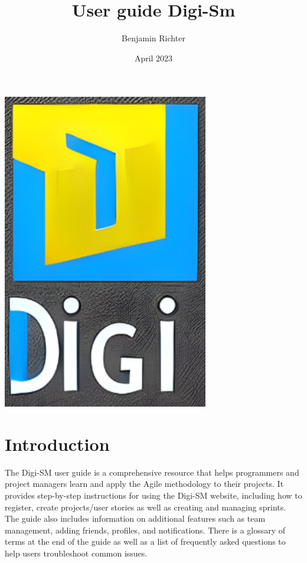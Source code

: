 \documentclass{article}
\title{User guide Digi-Sm}
\author{Benjamin Richter}
\date{April 2023}
\begin{document}
\maketitle


\vfill

\begin{center}
    \includegraphics[width=9cm]{logo1.png}
\end{center}



\newpage





\tableofcontents
\clearpage


\section{Introduction}

The Digi-SM user guide is a comprehensive resource that helps programmers and project managers learn and apply the Agile methodology to their projects. It provides step-by-step instructions for using the Digi-SM website, including how to register, create projects/user stories as well as creating and managing sprints. The guide also includes information on additional features such as team management, adding friends, profiles, and notifications. There is a glossary of terms at the end of the guide as well as a list of frequently asked questions to help users troubleshoot common issues.
\end{document}
